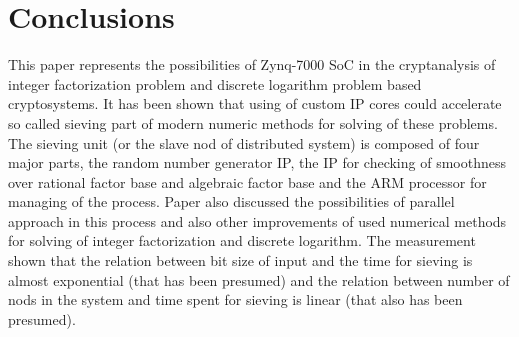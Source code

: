 \documentclass[conference]{IEEEtran}
\begin{document}
\section{Conclusions}%
This paper represents the possibilities of Zynq-7000 SoC in the cryptanalysis of integer factorization problem and discrete logarithm problem based cryptosystems. It has been shown that using of custom IP cores could accelerate so called sieving part of modern numeric methods for solving of these problems. The sieving unit (or the slave nod of distributed system) is composed of four major parts, the random number generator IP, the IP for checking of smoothness over rational factor base and algebraic factor base and the ARM processor for managing of the process. Paper also discussed the possibilities of parallel approach in this process and also other improvements of used numerical methods for solving of integer factorization and discrete logarithm. The measurement shown that the relation between bit size of input and the time for sieving is almost exponential (that has been presumed) and the relation between number of nods in the system and time spent for sieving is linear (that also has been presumed).


\end{document}
